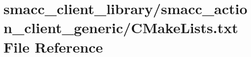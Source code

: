 \hypertarget{smacc__client__library_2smacc__action__client__generic_2CMakeLists_8txt}{}\section{smacc\+\_\+client\+\_\+library/smacc\+\_\+action\+\_\+client\+\_\+generic/\+C\+Make\+Lists.txt File Reference}
\label{smacc__client__library_2smacc__action__client__generic_2CMakeLists_8txt}
